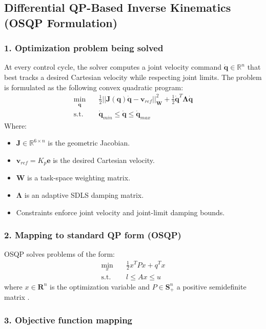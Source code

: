 \documentclass[12pt,a4paper]{report}
\begin{document}
\subsection{Differential QP-Based Inverse Kinematics (OSQP Formulation)}

\subsubsection{1. Optimization problem being solved}
At every control cycle, the solver computes a joint velocity command $\dot{\mathbf{q}} \in \mathbb{R}^n$ that best tracks a desired Cartesian velocity while respecting joint limits. The problem is formulated as the following convex quadratic program:
\begin{align}
    \min_{\dot{\mathbf{q}}} \quad & \frac{1}{2} || \mathbf{J}(\mathbf{q})\dot{\mathbf{q}} - \mathbf{v}_{ref} ||_{\mathbf{W}}^2 + \frac{1}{2} \dot{\mathbf{q}}^T \mathbf{\Lambda} \dot{\mathbf{q}} \\
    \text{s.t.} \quad & \dot{\mathbf{q}}_{min} \leq \dot{\mathbf{q}} \leq \dot{\mathbf{q}}_{max}
\end{align}
Where:
\begin{itemize}
    \item $\mathbf{J} \in \mathbb{R}^{6 \times n}$ is the geometric Jacobian.
    \item $\mathbf{v}_{ref} = K_p \mathbf{e}$ is the desired Cartesian velocity.
    \item $\mathbf{W}$ is a task-space weighting matrix.
    \item $\mathbf{\Lambda}$ is an adaptive SDLS damping matrix.
    \item Constraints enforce joint velocity and joint-limit damping bounds.
\end{itemize}

\subsubsection{2. Mapping to standard QP form (OSQP)}
OSQP solves problems of the form:
\begin{align}
    \min_{x} \quad & \frac{1}{2} x^T P x + q^T x \\
    \text{s.t.} \quad & l \leq A x \leq u
\end{align}
where $x \in \mathbf{R}^n$ is the optimization variable and $P \in \mathbf{S}^n_+$ a positive semidefinite matrix \cite{osqp}.

\subsubsection{3. Objective function mapping}
\end{document}
